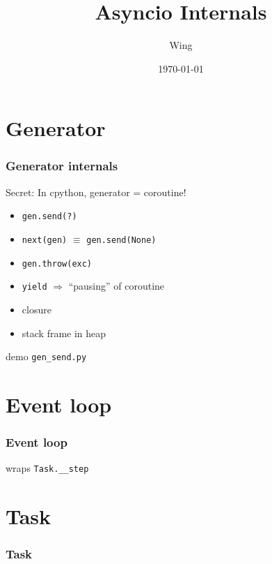 \documentclass[compress,usenames,dvipsnames]{beamer}
\author{Wing}
\title{Asyncio Internals}
\begin{document}
\date{\today} 

\frame[plain]{\titlepage} %

\section{Generator}
\begin{frame}[plain]
    \frametitle{Generator internals}
    Secret: In cpython, generator = coroutine!
    \begin{itemize}
        \item {\lstinline{gen.send(?)}}
        \item {\lstinline{next(gen)}} $\equiv$ {\lstinline{gen.send(None)}}
        \item {\lstinline{gen.throw(exc)}}
        \item {\lstinline{yield}} $\Rightarrow$ ``pausing'' of coroutine
        \item closure
        \item stack frame in heap

    \end{itemize}
    demo {\lstinline{gen_send.py}}
\end{frame}

\section{Event loop}

\begin{frame}
    \frametitle{Event loop}
    \begin{center}
    \begin{adjustbox}{}
         
    \end{adjustbox}
    \end{center}
    {} wraps \verb|Task.__step|
\end{frame}

\section{Task}

\begin{frame}[plain, t]
    \frametitle{Task}
    \begin{center}
    \begin{adjustbox}{margin=10pt}
             
    \end{adjustbox}
    \end{center}
\end{frame}
\end{document}
